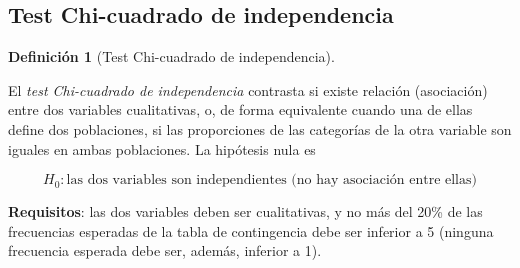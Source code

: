 \documentclass[
  spanish,
  a4paper,
]{scrreport}
\theoremstyle{definition}
\theoremstyle{definition}
\newtheorem{definition}{Definición}[chapter]
\theoremstyle{remark}
\begin{document}
\subsection{Test Chi-cuadrado de
independencia}\label{test-chi-cuadrado-de-independencia}

\begin{definition}[Test Chi-cuadrado de
independencia]\protect\hypertarget{def-dosindep-test-chi-cuadrado}{}\label{def-dosindep-test-chi-cuadrado}

El \emph{test Chi-cuadrado de independencia} contrasta si existe
relación (asociación) entre dos variables cualitativas, o, de forma
equivalente cuando una de ellas define dos poblaciones, si las
proporciones de las categorías de la otra variable son iguales en ambas
poblaciones. La hipótesis nula es

\[H_0: \mbox{las dos variables son independientes (no hay asociación entre ellas)}\]

\end{definition}

\textbf{Requisitos}: las dos variables deben ser cualitativas, y no más
del 20\% de las frecuencias esperadas de la tabla de contingencia debe
ser inferior a 5 (ninguna frecuencia esperada debe ser, además, inferior
a 1).
\end{document}
